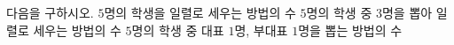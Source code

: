 다음을 구하시오.
 $5$명의 학생을 일렬로 세우는 방법의 수
 $5$명의 학생 중 $3$명을 뽑아 일렬로 세우는 방법의 수
 $5$명의 학생 중 대표 $1$명, 부대표 $1$명을 뽑는 방법의 수
